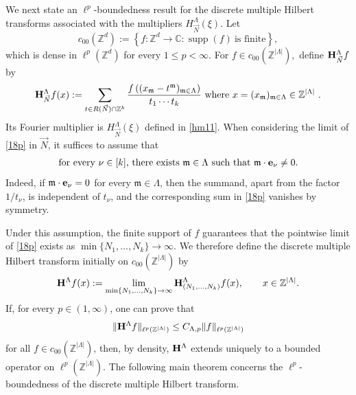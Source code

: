 \documentclass[11 pt,letterpaper]{amsart}
\theoremstyle{plain}
\theoremstyle{definition}
\theoremstyle{remark} \theoremstyle{exam} \theoremstyle{ob}
\numberwithin{equation}{section}
\begin{document}
 

We next state an $\ell^p$-boundedness result for the discrete
multiple Hilbert transforms associated with the multipliers
$H^\Lambda_{\vec N}(\xi)$. Let
\[
c_{00}(\mathbb{Z}^d)
:=
\left\{
f:\mathbb{Z}^d\to\mathbb{C}
:
\operatorname{supp}(f)\ \text{is finite}
\right\},
\]
which  is dense in
$\ell^p(\mathbb{Z}^d)$ for every $1\leq p<\infty$.  For  
$f\in c_{00}(\mathbb{Z}^{|\Lambda|}),$ define
${\bf H}^{\Lambda}_{\vec N}f$  by
\begin{align}\label{18p}
	{\bf H}^{\Lambda}_{\vec N}f(x)
	:=
	\sum_{t\in R(\vec N)\cap\mathbb{Z}^k}
	\frac{
		f\left(
		(x_{\mathfrak m}-t^{\mathfrak m})_{\mathfrak m\in\Lambda}
		\right)
	}{
		t_1\cdots t_k
	}\ \text{where $x=(x_{\mathfrak m})_{\mathfrak m\in\Lambda}
		\in\mathbb{Z}^{|\Lambda|}$ }.
\end{align}
Its Fourier multiplier is $H_{\vec N}^{\Lambda}(\xi)$ defined in
\eqref{hm11}. 
When considering the limit of  \eqref{18p} in $\vec{N}$,
it suffices to assume that
\begin{align*}
	\text{for every $\nu\in[k]$, there exists $\mathfrak m\in\Lambda$
		such that $\mathfrak m\cdot{\bf e}_\nu\neq0$.}
\end{align*}
Indeed, if $\mathfrak m\cdot{\bf e}_\nu=0$ for every
$\mathfrak m\in\Lambda$, then the summand, apart from the factor
$1/t_\nu$, is independent of $t_\nu$, and the corresponding sum in \eqref{18p} 
vanishes by symmetry.

Under this assumption, the finite support of $f$ guarantees that the
pointwise limit of \eqref{18p} exists as
$\min\{N_1,\ldots,N_k\}\to\infty$.
 We therefore define the discrete
multiple Hilbert transform initially on
$c_{00}(\mathbb{Z}^{|\Lambda|})$ by
\begin{align}\label{s2}
	{\bf H}^{\Lambda}f(x)
	:=
	\lim_{\min\{N_1,\ldots,N_k\}\to\infty}
	{\bf H}^{\Lambda}_{(N_1,\ldots,N_k)}f(x),
	\qquad
	x\in\mathbb{Z}^{|\Lambda|}.
\end{align}
If, for every $p\in(1,\infty)$, one can prove that
\[
\|{\bf H}^{\Lambda}f\|_{\ell^p(\mathbb{Z}^{|\Lambda|})}
\leq
C_{\Lambda,p}
\|f\|_{\ell^p(\mathbb{Z}^{|\Lambda|})}
\]
for all $f\in c_{00}(\mathbb{Z}^{|\Lambda|})$, then, by density,
${\bf H}^{\Lambda}$ extends uniquely to a bounded operator on
$\ell^p(\mathbb{Z}^{|\Lambda|})$. The following main theorem concerns the $\ell^p$-boundedness of the discrete multiple Hilbert transform.
\end{document}
